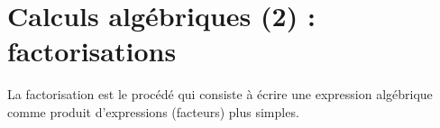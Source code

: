 \documentclass[main.tex]{subfiles}
\begin{document}
 
\cleardoublepage
{}  
\pagestyle{scrheadings} %
\onehalfspacing 
\setcounter{chapter}{13}

\chapter{Calculs algébriques (2) : factorisations}


\begin{eBox}
	La factorisation est le procédé qui consiste à écrire une expression algébrique comme produit d'expressions (facteurs) plus simples.
\end{eBox}
\end{document}
